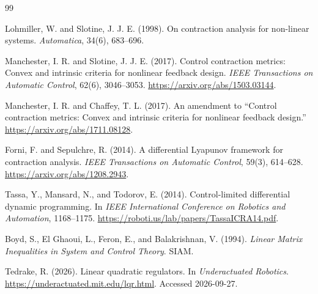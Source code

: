 \documentclass[11pt,letterpaper]{article}
\begin{document}
{}

\begin{thebibliography}{99}

Lohmiller, W. and Slotine, J. J. E. (1998).
On contraction analysis for non-linear systems.
\emph{Automatica}, 34(6), 683--696.

Manchester, I. R. and Slotine, J. J. E. (2017).
Control contraction metrics: Convex and intrinsic criteria for nonlinear feedback design.
\emph{IEEE Transactions on Automatic Control}, 62(6), 3046--3053.
\url{https://arxiv.org/abs/1503.03144}.

Manchester, I. R. and Chaffey, T. L. (2017).
An amendment to ``Control contraction metrics: Convex and intrinsic criteria for nonlinear feedback design.''
\url{https://arxiv.org/abs/1711.08128}.

Forni, F. and Sepulchre, R. (2014).
A differential Lyapunov framework for contraction analysis.
\emph{IEEE Transactions on Automatic Control}, 59(3), 614--628.
\url{https://arxiv.org/abs/1208.2943}.

Tassa, Y., Mansard, N., and Todorov, E. (2014).
Control-limited differential dynamic programming.
In \emph{IEEE International Conference on Robotics and Automation}, 1168--1175.
\url{https://roboti.us/lab/papers/TassaICRA14.pdf}.

Boyd, S., El Ghaoui, L., Feron, E., and Balakrishnan, V. (1994).
\emph{Linear Matrix Inequalities in System and Control Theory}.
SIAM.

Tedrake, R. (2026).
Linear quadratic regulators. In \emph{Underactuated Robotics}.
\url{https://underactuated.mit.edu/lqr.html}. Accessed 2026-09-27.

\end{thebibliography}
\end{document}
